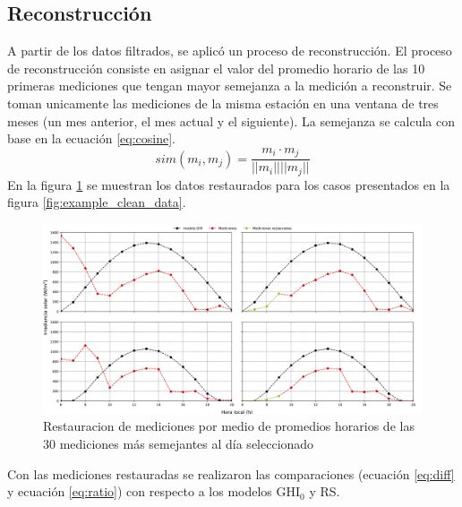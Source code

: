 \subsection{Reconstrucción}
A partir de los datos filtrados, se aplicó un proceso de reconstrucción. El proceso de reconstrucción consiste en asignar el valor del promedio horario de las 10 primeras mediciones que tengan mayor semejanza a la medición a reconstruir. Se toman unicamente las mediciones de la misma estación en una ventana de tres meses (un mes anterior, el mes actual y el siguiente). La semejanza se calcula con base en la ecuación \ref{eq:cosine}.
\begin{equation}
	sim(m_i , m_j ) = \frac{m_i \cdot m_j}{||m_i|| ||m_j||}
	\label{eq:cosine}
\end{equation}
En la figura \ref{fig:restoration} se muestran los datos restaurados para los casos presentados en la figura \ref{fig:example_clean_data}.
\begin{figure}[H]
	\centering
	\includegraphics[width=12cm]{Graphics/example_restoration.png}
	\caption{Restauracion de mediciones por medio de promedios horarios de las 30 mediciones más semejantes al día seleccionado}
	\label{fig:restoration}
\end{figure}
Con las mediciones restauradas se realizaron las comparaciones (ecuación \ref{eq:diff} y ecuación \ref{eq:ratio}) con respecto a los modelos GHI$_0$ y RS.
